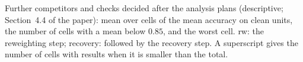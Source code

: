 \begin{table}[htbp]
\centering
\footnotesize
\caption{Further competitors and checks decided after the analysis plans (descriptive;
Section~4.4 of the paper): mean over cells of the mean accuracy on clean units, the number of cells
with a mean below $0.85$, and the worst cell. rw: the reweighting step; recovery: followed by the
recovery step. A superscript gives the number of cells with results when it is smaller than the
total.}
\label{tab:S39}
\resizebox{\textwidth}{!}{}
\end{table}
